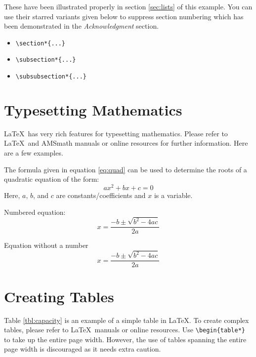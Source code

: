 \documentclass[fleqn, 10pt, twoside, blindreview]{IOEGC}
\begin{document}
These have been illustrated properly in section \ref{sec:lists} of this example.
You can use their starred variants given below to suppress section numbering 
which has been demonstrated in the \emph{Acknowledgment} section.

\begin{itemize}[noitemsep]
	\item \verb+\section*{...}+
	\item \verb+\subsection*{...}+
	\item \verb+\subsubsection*{...}+
\end{itemize} 


\section{Typesetting Mathematics}
\LaTeX\ has very rich features for typesetting mathematics. Please refer to 
\LaTeX\ and AMSmath manuals or online resources for further information. 
Here are a few examples.

The formula given in equation \ref{eq:quad} can be used to determine the roots 
of a quadratic equation of the form: $$ax^2+bx+c=0$$
Here, $a$, $b$, and $c$ are constants/coefficients and $x$ is a variable.

Numbered equation:
\begin{equation}
	x= \frac{-b\pm \sqrt{ b^2-4ac}}{2a}
	\label{eq:quad}
\end{equation} 

Equation without a number
\begin{equation*}
	x = \frac{-b\pm \sqrt{ b^2-4ac}}{2a}
\end{equation*} 

\section{Creating Tables}
Table \ref{tbl:capacity} is an example of a simple table in \LaTeX. To create 
complex tables, please refer to \LaTeX\ manuals or online resources. Use 
\verb+\begin{table*}+ to take up the entire page width. However, the use of 
tables spanning the entire page width is discouraged as it needs extra caution.
\end{document}
